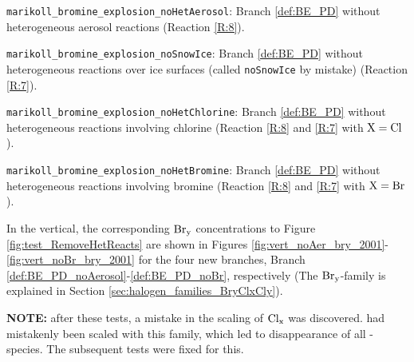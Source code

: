 \begin{mydef}\label{def:BE_PD_noAerosol}
    \texttt{marikoll\_bromine\_explosion\_noHetAerosol}: Branch \ref{def:BE_PD} without heterogeneous aerosol reactions (Reaction \ref{R:8}). 
\end{mydef}

\begin{mydef}\label{def:BE_PD_noIce}
    \texttt{marikoll\_bromine\_explosion\_noSnowIce}: Branch \ref{def:BE_PD} without heterogeneous reactions over ice surfaces (called \texttt{noSnowIce} by mistake) (Reaction \ref{R:7}).
\end{mydef}

\begin{mydef}\label{def:BE_PD_noCl}
    \texttt{marikoll\_bromine\_explosion\_noHetChlorine}: Branch \ref{def:BE_PD} without heterogeneous reactions involving chlorine (Reaction \ref{R:8} and \ref{R:7} with $\mathrm{X} = \mathrm{Cl}$).
\end{mydef}

\begin{mydef}\label{def:BE_PD_noBr}
    \texttt{marikoll\_bromine\_explosion\_noHetBromine}: Branch \ref{def:BE_PD} without heterogeneous reactions involving bromine (Reaction \ref{R:8} and \ref{R:7} with $\mathrm{X} = \mathrm{Br}$).
\end{mydef}








\medskip

In the vertical, the corresponding $\mathrm{Br_y}$ concentrations to Figure \ref{fig:test_RemoveHetReacts} are shown in Figures \ref{fig:vert_noAer_bry_2001}-\ref{fig:vert_noBr_bry_2001} for the four new branches, Branch \ref{def:BE_PD_noAerosol}-\ref{def:BE_PD_noBr}, respectively (The $\mathrm{Br_y}$-family is explained in Section \ref{sec:halogen_families_BryClxCly}). 












\textbf{NOTE:} after these tests, a mistake in the scaling of $\mathrm{Cl_x}$ was discovered.  had mistakenly been scaled with this family, which led to disappearance of all -species. The subsequent tests were fixed for this.

